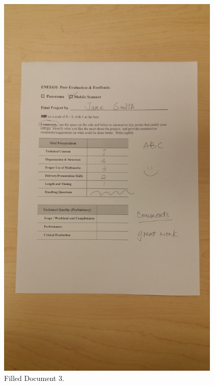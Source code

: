 \begin{figure}[th]
	\centering
	\includegraphics[height=19cm ]{Figures/test_scanned_image}
	\caption[Filled Document 3]{Filled Document 3.}
	\label{fig:FilledDocument3}
\end{figure}
\pagebreak
